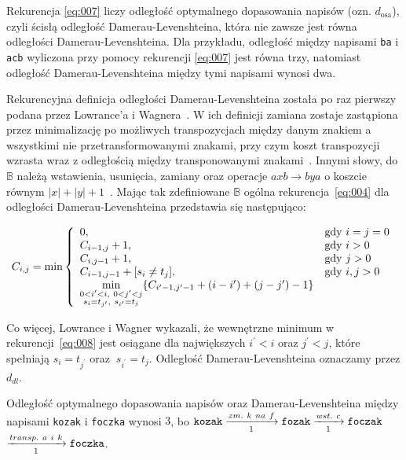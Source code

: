 \documentclass{praca1}
\begin{document}
Rekurencja \ref{eq:007} liczy odległość optymalnego dopasowania napisów (ozn. $d_{\mathrm{osa}}$), czyli ścisłą odległość Damerau-Levenshteina, która nie zawsze jest równa odległości Damerau-Levenshteina. Dla przykładu, odległość między napisami \verb|ba| i \verb|acb| wyliczona przy pomocy rekurencji \ref{eq:007} jest równa trzy, natomiast odległość Damerau-Levenshteina między tymi napisami wynosi dwa.

Rekurencyjna definicja odległości Damerau-Levenshteina została po raz pierwszy podana przez Lowrance'a i Wagnera~\cite{Wagner1975:extensionstring}. W ich definicji zamiana zostaje zastąpiona przez minimalizację po możliwych transpozycjach między danym znakiem a wszystkimi nie przetransformowanymi znakami, przy czym koszt transpozycji wzrasta wraz z odległością między transponowanymi znakami~\cite{Loo2014:stringdist}. Innymi słowy, do $\mathbb{B}$ należą wstawienia, usunięcia, zamiany oraz operacje $axb \rightarrow bya$ o koszcie równym $|x| + |y| + 1$~\cite{Boytsov2011:indexingmethods}. Mając tak zdefiniowane $\mathbb{B}$ ogólna rekurencja~\ref{eq:004} dla odległości Damerau-Levenshteina przedstawia się następująco: 

\begin{equation}
\label{eq:008}
C_{i,j} = \min\left\{
\begin{array}{l l}     
    0, & \text{gdy } i = j = 0\\
    C_{i-1, j} + 1, & \text{gdy } i > 0 \\
    C_{i, j-1} + 1, & \text{gdy } j > 0 \\
    C_{i-1, j-1} + [s_{i}\neq t_{j}], & \text{gdy } i, j > 0 \\
    \min\limits_{\substack{0 < i^{\prime} < i,\ 0 < j^{\prime} < j  \\ s_i = t_{j^{\prime}},\ s_{i^{\prime}} = t_j}} \{C_{i^{\prime}-1, j^{\prime}-1} + (i-i^{\prime}) + (j-j^{\prime}) - 1\}
\end{array}\right.
\end{equation}

Co więcej, Lowrance i Wagner wykazali, że wewnętrzne minimum w rekurencji~\ref{eq:008} jest osiągane dla największych $i^{\prime} < i$ oraz $j^{\prime} < j$, które spełniają $s_i = t_{j^{\prime}}$ oraz $\ s_{i^{\prime}} = t_j$. Odległość Damerau-Levenshteina oznaczamy przez $d_{dl}$.

\begin{example}
Odległość optymalnego dopasowania napisów oraz Damerau-Levenshteina między napisami \verb|kozak| i \verb|foczka| wynosi $3$, bo $\verb|kozak| \xrightarrow[1]{zm.\ k\ na\ f} \verb|fozak|  \xrightarrow[1]{wst.\ c} \verb|foczak|$ $\xrightarrow[1]{transp.\ a\ i\ k} \verb|foczka|$.
\end{example}
\end{document}
